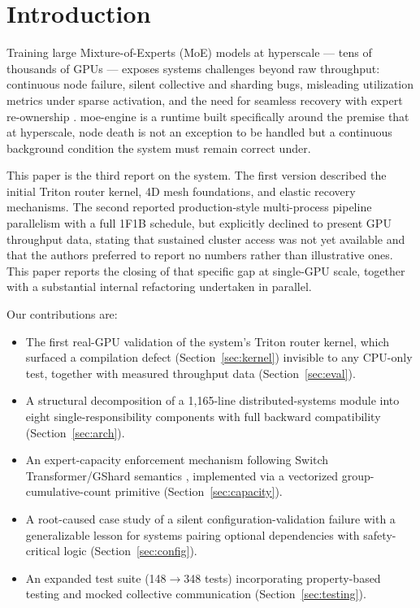 \documentclass[conference]{IEEEtran}
\begin{document}
\section{Introduction}

Training large Mixture-of-Experts (MoE) models at hyperscale --- tens of
thousands of GPUs --- exposes systems challenges beyond raw throughput:
continuous node failure, silent collective and sharding bugs, misleading
utilization metrics under sparse activation, and the need for seamless
recovery with expert re-ownership \cite{shoeybi2019megatron,
rasley2020deepspeed}. moe-engine is a runtime built specifically around the
premise that at hyperscale, node death is not an exception to be handled
but a continuous background condition the system must remain correct
under.

This paper is the third report on the system. The first version described
the initial Triton router kernel, 4D mesh foundations, and elastic recovery
mechanisms. The second reported production-style multi-process pipeline
parallelism with a full 1F1B schedule, but explicitly declined to present
GPU throughput data, stating that sustained cluster access was not yet
available and that the authors preferred to report no numbers rather than
illustrative ones. This paper reports the closing of that specific gap at
single-GPU scale, together with a substantial internal refactoring
undertaken in parallel.

Our contributions are:
\begin{itemize}
\item The first real-GPU validation of the system's Triton router kernel,
  which surfaced a compilation defect (Section~\ref{sec:kernel}) invisible
  to any CPU-only test, together with measured throughput data
  (Section~\ref{sec:eval}).
\item A structural decomposition of a 1{,}165-line distributed-systems
  module into eight single-responsibility components with full backward
  compatibility (Section~\ref{sec:arch}).
\item An expert-capacity enforcement mechanism following Switch
  Transformer/GShard semantics \cite{fedus2021switch, lepikhin2020gshard},
  implemented via a vectorized group-cumulative-count primitive
  (Section~\ref{sec:capacity}).
\item A root-caused case study of a silent configuration-validation
  failure with a generalizable lesson for systems pairing optional
  dependencies with safety-critical logic (Section~\ref{sec:config}).
\item An expanded test suite (148$\to$348 tests) incorporating
  property-based testing and mocked collective communication
  (Section~\ref{sec:testing}).
\end{itemize}
\end{document}
